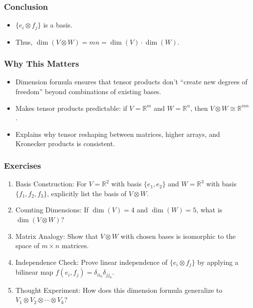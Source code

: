 \documentclass[
  letterpaper,
  DIV=11,
  numbers=noendperiod]{scrreprt}
\providecommand{\tightlist}{%
  \setlength{\itemsep}{0pt}\setlength{\parskip}{0pt}}
\begin{document}
\subsubsection{Conclusion}\label{conclusion}

\begin{itemize}
\tightlist
\item
  \(\{e_i \otimes f_j\}\) is a basis.
\item
  Thus, \(\dim(V \otimes W) = mn = \dim(V) \cdot \dim(W)\).
\end{itemize}

\subsubsection{Why This Matters}\label{why-this-matters-61}

\begin{itemize}
\tightlist
\item
  Dimension formula ensures that tensor products don't ``create new
  degrees of freedom'' beyond combinations of existing bases.
\item
  Makes tensor products predictable: if \(V = \mathbb{R}^m\) and
  \(W = \mathbb{R}^n\), then \(V \otimes W \cong \mathbb{R}^{mn}\).
\item
  Explains why tensor reshaping between matrices, higher arrays, and
  Kronecker products is consistent.
\end{itemize}

\subsubsection{Exercises}\label{exercises-76}

\begin{enumerate}
\def\labelenumi{\arabic{enumi}.}
\item
  Basis Construction: For \(V = \mathbb{R}^2\) with basis
  \(\{e_1,e_2\}\) and \(W = \mathbb{R}^3\) with basis
  \(\{f_1,f_2,f_3\}\), explicitly list the basis of \(V \otimes W\).
\item
  Counting Dimensions: If \(\dim(V)=4\) and \(\dim(W)=5\), what is
  \(\dim(V \otimes W)\)?
\item
  Matrix Analogy: Show that \(V \otimes W\) with chosen bases is
  isomorphic to the space of \(m \times n\) matrices.
\item
  Independence Check: Prove linear independence of
  \(\{e_i \otimes f_j\}\) by applying a bilinear map
  \(f(e_i,f_j) = \delta_{ii_0}\delta_{jj_0}\).
\item
  Thought Experiment: How does this dimension formula generalize to
  \(V_1 \otimes V_2 \otimes \cdots \otimes V_k\)?
\end{enumerate}
\end{document}
